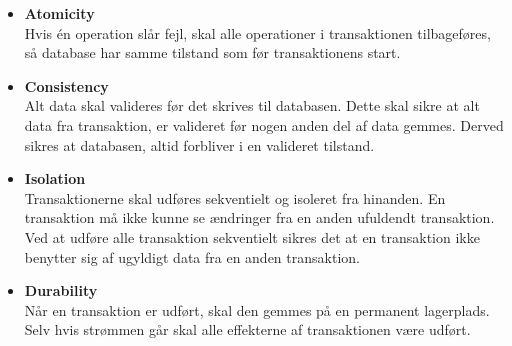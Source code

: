 \begin{itemize}
	\item \textbf{Atomicity} \\
		Hvis én operation slår fejl, skal alle operationer i transaktionen tilbageføres, så database har samme tilstand som før transaktionens start. 

	\item \textbf{Consistency} \\
		Alt data skal valideres før det skrives til databasen. Dette skal sikre at alt data fra transaktion, er valideret før nogen anden del af data gemmes. Derved sikres at databasen, altid forbliver i en valideret tilstand.

	\item \textbf{Isolation} \\
		Transaktionerne skal udføres sekventielt og isoleret fra hinanden. En transaktion må ikke kunne se ændringer fra en anden ufuldendt transaktion. Ved at udføre alle transaktion sekventielt sikres det at en transaktion ikke benytter sig af ugyldigt data fra en anden transaktion.

	\item \textbf{Durability} \\
		Når en transaktion er udført, skal den gemmes på en permanent lagerplads. Selv hvis strømmen går skal alle effekterne af transaktionen være udført.
\end{itemize}

